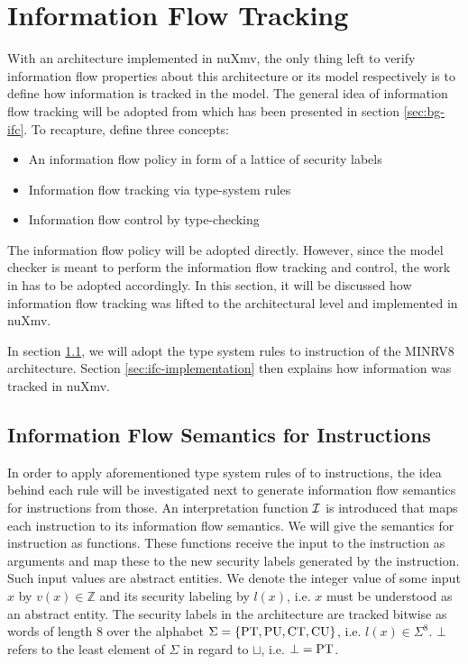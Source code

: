 
\section{Information Flow Tracking}
\label{sec:ifc}

With an architecture implemented in nuXmv, the only thing left to verify information flow properties about this architecture or its model respectively is to define how information is tracked in the model.
The general idea of information flow tracking will be adopted from \cite{Ferraiuolo17} which has been presented in section \ref{sec:bg-ifc}.
To recapture, \citeauthor{Ferraiuolo17} define three concepts:
\begin{itemize}
    \item An information flow policy in form of a lattice of security labels
    \item Information flow tracking via type-system rules
    \item Information flow control by type-checking
\end{itemize}

The information flow policy will be adopted directly.
However, since the model checker is meant to perform the information flow tracking and control, the work in \cite{Ferraiuolo17} has to be adopted accordingly.
In this section, it will be discussed how information flow tracking was lifted to the architectural level and implemented in nuXmv.

In section \ref{sec:ifc-model}, we will adopt the type system rules to instruction of the MINRV8 architecture.
Section \ref{sec:ifc-implementation} then explains how information was tracked in nuXmv.

\subsection{Information Flow Semantics for Instructions}
\label{sec:ifc-model}

In order to apply aforementioned type system rules of \cite{Ferraiuolo17} to instructions, the idea behind each rule will be investigated next to generate information flow semantics for instructions from those.
An interpretation function $ \mathcal{I} $ is introduced that maps each instruction to its information flow semantics.
We will give the semantics for instruction as functions.
These functions receive the input to the instruction as arguments and map these to the new security labels generated by the instruction.
Such input values are abstract entities.
We denote the integer value of some input $ x $ by $ v(x) \in \mathbb{Z} $ and its security labeling by $ l(x) $, i.e. $ x $ must be understood as an abstract entity.
The security labels in the architecture are tracked bitwise as words of length 8 over the alphabet $ \Sigma = \{ \text{PT}, \text{PU}, \text{CT}, \text{CU} \} $, i.e. $ l(x) \in \Sigma^8 $.
$ \bot $ refers to the least element of $ \Sigma $ in regard to $ \sqcup $, i.e. $ \bot = \text{PT} $.

